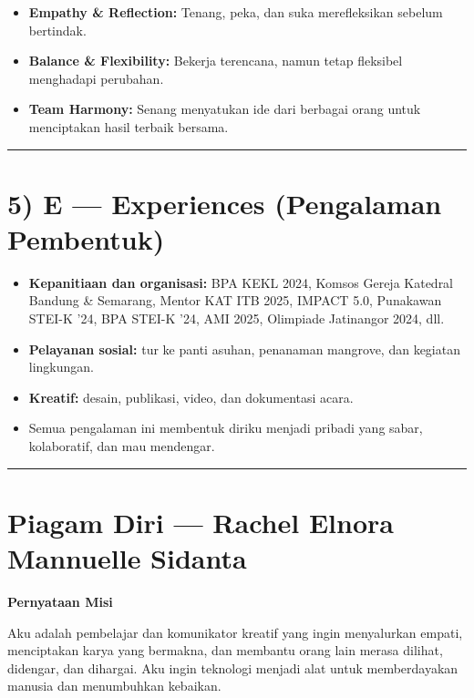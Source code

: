 \documentclass[
  letterpaper,
  DIV=11,
  numbers=noendperiod]{scrreprt}
\providecommand{\tightlist}{%
  \setlength{\itemsep}{0pt}\setlength{\parskip}{0pt}}
\begin{document}
\begin{itemize}
\tightlist
\item
  \textbf{Empathy \& Reflection:} Tenang, peka, dan suka merefleksikan
  sebelum bertindak.
\item
  \textbf{Balance \& Flexibility:} Bekerja terencana, namun tetap
  fleksibel menghadapi perubahan.
\item
  \textbf{Team Harmony:} Senang menyatukan ide dari berbagai orang untuk
  menciptakan hasil terbaik bersama.
\end{itemize}

\begin{center}\rule{0.5\linewidth}{0.5pt}\end{center}

\section{5) E --- Experiences (Pengalaman
Pembentuk)}\label{e-experiences-pengalaman-pembentuk}

\begin{itemize}
\tightlist
\item
  \textbf{Kepanitiaan dan organisasi:} BPA KEKL 2024, Komsos Gereja
  Katedral Bandung \& Semarang, Mentor KAT ITB 2025, IMPACT 5.0,
  Punakawan STEI-K '24, BPA STEI-K '24, AMI 2025, Olimpiade Jatinangor
  2024, dll.
\item
  \textbf{Pelayanan sosial:} tur ke panti asuhan, penanaman mangrove,
  dan kegiatan lingkungan.
\item
  \textbf{Kreatif:} desain, publikasi, video, dan dokumentasi acara.
\item
  Semua pengalaman ini membentuk diriku menjadi pribadi yang sabar,
  kolaboratif, dan mau mendengar.
\end{itemize}

\begin{center}\rule{0.5\linewidth}{0.5pt}\end{center}

\section{Piagam Diri --- Rachel Elnora Mannuelle
Sidanta}\label{piagam-diri-rachel-elnora-mannuelle-sidanta}

\textbf{Pernyataan Misi}

Aku adalah pembelajar dan komunikator kreatif yang ingin menyalurkan
empati, menciptakan karya yang bermakna, dan membantu orang lain merasa
dilihat, didengar, dan dihargai. Aku ingin teknologi menjadi alat untuk
memberdayakan manusia dan menumbuhkan kebaikan.
\end{document}
